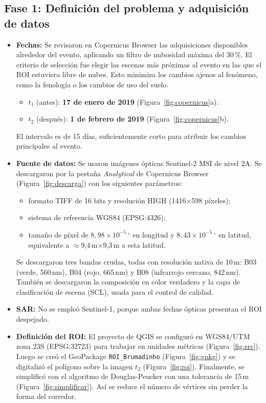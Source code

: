 \documentclass[12pt]{article}
\begin{document}
\subsection{Fase 1: Definición del problema y adquisición de datos}
\begin{itemize}
    \item \textbf{Fechas:} Se revisaron en Copernicus Browser las adquisiciones disponibles alrededor del evento, aplicando un filtro de nubosidad máxima del 30\,\%. El criterio de selección fue elegir las escenas más próximas al evento en las que el ROI estuviera libre de nubes. Esto minimiza los cambios ajenos al fenómeno, como la fenología o los cambios de uso del suelo.
    \begin{itemize}
        \item $t_1$ (antes): \textbf{17 de enero de 2019} (Figura~\ref{fig:copernicus}a).
        \item $t_2$ (después): \textbf{1 de febrero de 2019} (Figura~\ref{fig:copernicus}b).
    \end{itemize}
    El intervalo es de 15 días, suficientemente corto para atribuir los cambios principales al evento.
    \item \textbf{Fuente de datos:} Se usaron imágenes ópticas Sentinel-2 MSI de nivel 2A. Se descargaron por la pestaña \emph{Analytical} de Copernicus Browser (Figura~\ref{fig:descarga}) con los siguientes parámetros:
    \begin{itemize}
        \item formato TIFF de 16 bits y resolución HIGH (1416$\times$598 píxeles);
        \item sistema de referencia WGS84 (EPSG:4326);
        \item tamaño de píxel de $8{,}98\times10^{-5}\,^\circ$ en longitud y $8{,}43\times10^{-5}\,^\circ$ en latitud, equivalente a $\approx$9{,}4\,m$\times$9{,}3\,m a esta latitud.
    \end{itemize}
    Se descargaron tres bandas crudas, todas con resolución nativa de 10\,m: B03 (verde, 560\,nm), B04 (rojo, 665\,nm) y B08 (infrarrojo cercano, 842\,nm). También se descargaron la composición en color verdadero y la capa de clasificación de escena (SCL), usada para el control de calidad.
    \item \textbf{SAR:} No se empleó Sentinel-1, porque ambas fechas ópticas presentan el ROI despejado.
    \item \textbf{Definición del ROI:} El proyecto de QGIS se configuró en WGS84/UTM zona 23S (EPSG:32723) para trabajar en unidades métricas (Figura~\ref{fig:src}). Luego se creó el GeoPackage \texttt{ROI\_Brumadinho} (Figura~\ref{fig:gpkg}) y se digitalizó el polígono sobre la imagen $t_2$ (Figura~\ref{fig:roi}). Finalmente, se simplificó con el algoritmo de Douglas-Peucker con una tolerancia de 15\,m (Figura~\ref{fig:simplificar}). Así se reduce el número de vértices sin perder la forma del corredor.
\end{itemize}
\end{document}
